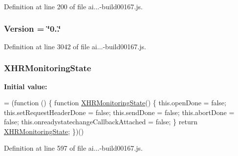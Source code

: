 Definition at line 200 of file ai...-\/build00167.\+js.

\subsubsection[{\texorpdfstring{Version}{Version}}]{ Version = \char`\"{}0..\char`\"{}}\hypertarget{_scripts_2ai_80_822_89-build00167_8js_a63eb1f8235088b82a68745786527b11b}{}\label{_scripts_2ai_80_822_89-build00167_8js_a63eb1f8235088b82a68745786527b11b}


Definition at line 3042 of file ai...-\/build00167.\+js.

\subsubsection[{\texorpdfstring{X\+H\+R\+Monitoring\+State}{XHRMonitoringState}}]{ X\+H\+R\+Monitoring\+State}\hypertarget{_scripts_2ai_80_822_89-build00167_8js_a4f771bfa65091853b832d27ff5e9c716}{}\label{_scripts_2ai_80_822_89-build00167_8js_a4f771bfa65091853b832d27ff5e9c716}
{\bfseries Initial value\+:}
\begin{DoxyCode}
= (\textcolor{keyword}{function} () \{
            \textcolor{keyword}{function} \hyperlink{obj_2_release_2_package_2_package_tmp_2_scripts_2ai_80_822_89-build00167_8js_a4f771bfa65091853b832d27ff5e9c716}{XHRMonitoringState}() \{
                this.openDone = \textcolor{keyword}{false};
                this.setRequestHeaderDone = \textcolor{keyword}{false};
                this.sendDone = \textcolor{keyword}{false};
                this.abortDone = \textcolor{keyword}{false};
                this.onreadystatechangeCallbackAttached = \textcolor{keyword}{false};
            \}
            \textcolor{keywordflow}{return} \hyperlink{obj_2_release_2_package_2_package_tmp_2_scripts_2ai_80_822_89-build00167_8js_a4f771bfa65091853b832d27ff5e9c716}{XHRMonitoringState};
        \})()
\end{DoxyCode}


Definition at line 597 of file ai...-\/build00167.\+js.

